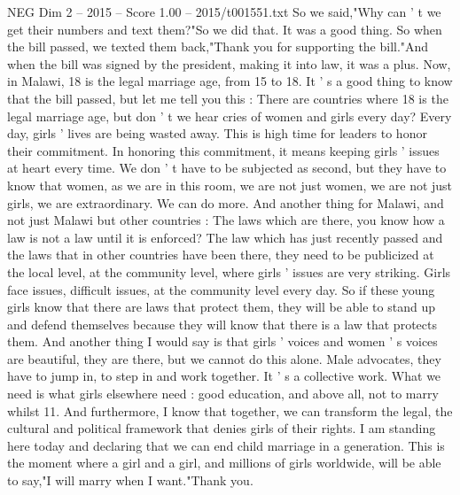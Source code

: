 \begin{textsample}{NEG Dim 2 – 2015 – Score 1.00 – 2015/t001551.txt}
So we said,"Why can ' t we get their numbers and text them?"So we did that.
It was a good thing.
So when the bill passed, we texted them back,"Thank you for supporting the bill."And when the bill was signed by the president, making it into law, it was a plus.
Now, in Malawi, 18 is the legal marriage age, from 15 to 18.
It ' s a good thing to know that the bill passed, but let me tell you this : There are countries where 18 is the legal marriage age, but don ' t we hear cries of women and girls every day?
Every day, girls ' lives are being wasted away.
This is high time for leaders to honor their commitment.
In honoring this commitment, it means keeping girls ' issues at heart every time.
We don ' t have to be subjected as second, but they have to know that women, as we are in this room, we are not just women, we are not just girls, we are extraordinary.
We can do more.
And another thing for Malawi, and not just Malawi but other countries : The laws which are there, you know how a law is not a law until it is enforced?
The law which has just recently passed and the laws that in other countries have been there, they need to be publicized at the local level, at the community level, where girls ' issues are very striking.
Girls face issues, difficult issues, at the community level every day.
So if these young girls know that there are laws that protect them, they will be able to stand up and defend themselves because they will know that there is a law that protects them.
And another thing I would say is that girls ' voices and women ' s voices are beautiful, they are there, but we cannot do this alone.
Male advocates, they have to jump in, to step in and work together.
It ' s a collective work.
What we need is what girls elsewhere need : good education, and above all, not to marry whilst 11.
And furthermore, I know that together, we can transform the legal, the cultural and political framework that denies girls of their rights.
I am standing here today and declaring that we can end child marriage in a generation.
This is the moment where a girl and a girl, and millions of girls worldwide, will be able to say,"I will marry when I want."Thank you.

\end{textsample}

